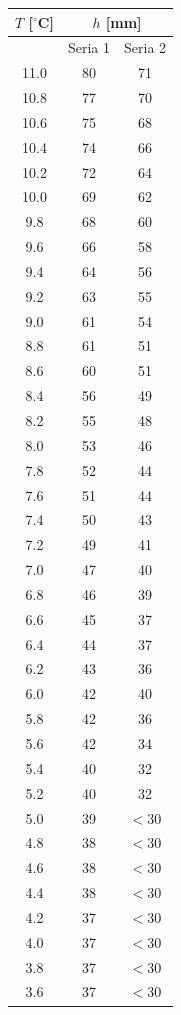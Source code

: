 \documentclass[a4paper,12pt]{article}
\begin{document}
\begin{longtable}{|c|c|c|}
    \hline
    $T$ [$^\circ$C] & \multicolumn{2}{c|}{$h$ [mm]} \\
    \hline
    & Seria 1 & Seria 2 \\
    \hline
    \endhead
    11.0 & 80 & 71 \\
    10.8 & 77 & 70 \\
    10.6 & 75 & 68 \\
    10.4 & 74 & 66 \\
    10.2 & 72 & 64 \\
    10.0 & 69 & 62 \\
    9.8  & 68 & 60 \\
    9.6  & 66 & 58 \\
    9.4  & 64 & 56 \\
    9.2  & 63 & 55 \\
    9.0  & 61 & 54 \\
    8.8  & 61 & 51 \\
    8.6  & 60 & 51 \\
    8.4  & 56 & 49 \\
    8.2  & 55 & 48 \\
    8.0  & 53 & 46 \\
    7.8  & 52 & 44 \\
    7.6  & 51 & 44 \\
    7.4  & 50 & 43 \\
    7.2  & 49 & 41 \\
    7.0  & 47 & 40 \\
    6.8  & 46 & 39 \\
    6.6  & 45 & 37 \\
    6.4  & 44 & 37 \\
    6.2  & 43 & 36 \\
    6.0  & 42 & 40 \\
    5.8  & 42 & 36 \\
    5.6  & 42 & 34 \\
    5.4  & 40 & 32 \\
    5.2  & 40 & 32 \\
    5.0  & 39 & $<30$ \\
    4.8  & 38 & $<30$ \\
    4.6  & 38 & $<30$ \\
    4.4  & 38 & $<30$ \\
    4.2  & 37 & $<30$ \\
    4.0  & 37 & $<30$ \\
    3.8  & 37 & $<30$ \\
    3.6  & 37 & $<30$ \\

\end{longtable}
\end{document}
